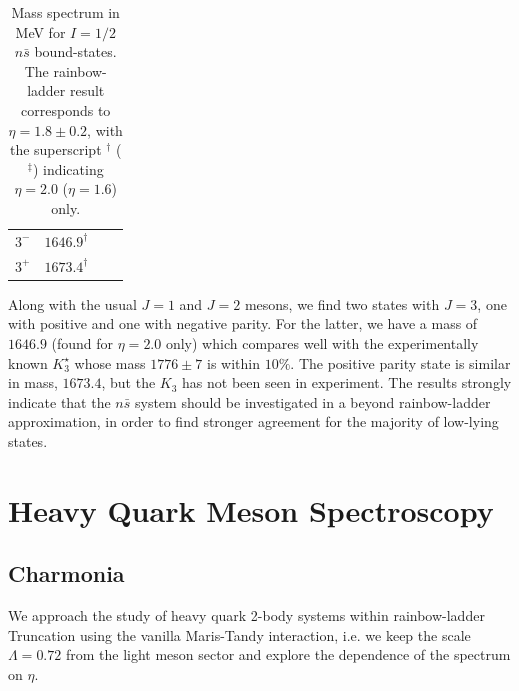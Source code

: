 \begin{table}
\begin{tabular}{c|ccc|}
{$3^-$}       & { $1646.9^\dag$ }  &   &  \\
{$3^+$}       & { $1673.4^\dag$  } &   &  \\                                                                                                                                                                  
\hline
\hline
\end{tabular}
\caption{Mass spectrum in MeV for $I=1/2$ $n\bar{s}$ bound-states. The rainbow-ladder result corresponds to $\eta=1.8\pm0.2$, with the 
superscript ${}^\dag$ (${}^\ddag$) indicating $\eta=2.0$ ($\eta=1.6$) only.}\label{tab:results_ns}
\end{table}
Along with the usual $J=1$ and $J=2$ mesons, we find two states with $J=3$, one with positive 
and one with negative parity. For the latter, we have a mass of $1646.9$ (found for $\eta=2.0$ only) 
which compares well with the experimentally known $K_3^\star$ whose mass $1776\pm7$ is within $10\%$. 
The positive parity state is similar in mass, $1673.4$, but the $K_3$ has not been seen in 
experiment. The results strongly indicate that the $n\bar{s}$ system should be investigated in a beyond rainbow-ladder 
approximation, in order to find stronger agreement for the majority of low-lying states. 

\section{Heavy Quark Meson Spectroscopy}
\subsection*{Charmonia}
\label{sec:charm}
%
%
%
%
%
%
We approach the study of heavy quark 2-body systems within rainbow-ladder Truncation using the vanilla Maris-Tandy interaction,
i.e. we keep the scale $\Lambda=0.72$ from the light meson sector and
explore the dependence of the spectrum on $\eta$.

